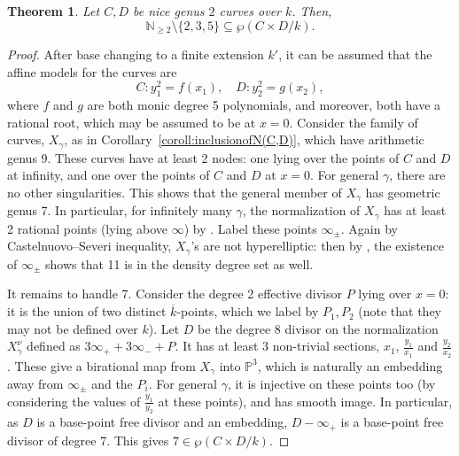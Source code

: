 \documentclass[a4paper,11pt]{amsart}
\theoremstyle{plain}
\newtheorem{thm}{Theorem}[section]
\theoremstyle{remark}
\newcommand{\potdendegs}{\wp}
\begin{document}
\begin{thm} Let $C,D$ be nice genus $2$ curves over $k$. Then,
\[\mathbb{N}_{\geq 2} \setminus \{2, 3, 5\} \subseteq \potdendegs(C\times D/k).\]
\label{thm:pot}
\end{thm}
\begin{proof}
After base changing to a finite extension $k'$, it can be assumed that the affine models for the curves are
\[
C: y_1^2 = f(x_1), \quad D: y_2^2 = g(x_2),
\]
where $f$ and $g$ are both monic degree 5 polynomials, and moreover, both have a rational root, which may be assumed to be at $x = 0$.
Consider the family of curves, $X_{\gamma}$, as in Corollary~\ref{coroll:inclusionofN(C,D)}, which have arithmetic genus 9. These curves have at least 2 nodes: one lying over the points of $C$ and $D$ at infinity, and one over the points of $C$ and $D$ at $x = 0$. For general $\gamma$, there are no other singularities. 
This shows that the general member of $X_{\gamma}$ has geometric genus 7. 
In particular, for infinitely many $\gamma$, the normalization of $X_{\gamma}$ has at least 2 rational points (lying above $\infty$) by . Label these points $\infty_{\pm}$. 
Again by Castelnuovo--Severi inequality, $X_\gamma$'s are not hyperelliptic: then by , the existence of $\infty_{\pm}$ shows that 11 is in the density degree set as well.

It remains to handle 7.
Consider the degree 2 effective divisor $P$ lying over $x = 0$: it is the union of two distinct $\overline{k}$-points, which we label by $P_1, P_2$ (note that they may not be defined over $k$).
Let $D$ be the degree 8 divisor on the normalization $X_\gamma^\nu$ defined as $ 3\infty_+ + 3\infty_- + P$. 
It has at least 3 non-trivial sections, $x_1$, $\frac{y_1}{x_1}$ and $\frac{y_2}{x_2}$. These give a birational map from $X_\gamma$ into $\mathbb{P}^3$, which is naturally an embedding away from $\infty_{\pm}$ and the $P_i$. For general $\gamma$, it is injective on these points too (by considering the values of $\frac{y_1}{y_2}$ at these points), and has smooth image. In particular, as $D$ is a base-point free divisor and an embedding, $D - \infty_+$ is a base-point free divisor of degree 7. This gives $7 \in \potdendegs(C \times D / k)$.
\end{proof}
\end{document}
